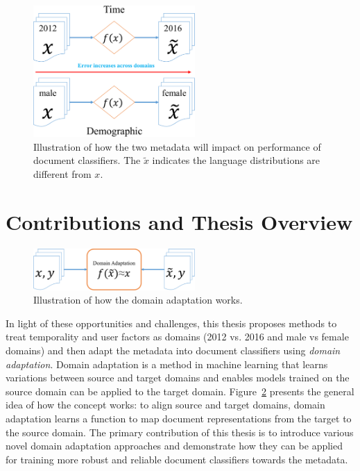 \begin{figure}[htp]
\centering
\includegraphics[width=0.55\textwidth]{images/chapter1/metadata_impact.pdf}
\caption{Illustration of how the two metadata will impact on performance of document classifiers. The $\tilde{x}$ indicates the language distributions are different from $x$.}
\label{chap1:fig:impact}
\end{figure}

\section{Contributions and Thesis Overview}

\begin{figure}[htp]
\centering
\includegraphics[width=0.55\textwidth]{images/chapter1/da_illu.pdf}
\caption{Illustration of how the domain adaptation works.}
\label{chap1:fig:da}
\end{figure}


In light of these opportunities and challenges, this thesis proposes methods to treat temporality and user factors as domains (2012 vs. 2016 and male vs female domains) and then adapt the metadata into document classifiers using \textit{domain adaptation}.
Domain adaptation is a method in machine learning that learns variations between source and target domains and enables models trained on the source domain can be applied to the target domain. 
Figure~\ref{chap1:fig:da} presents the general idea of how the concept works: to align source and target domains, domain adaptation learns a function to map document representations from the target to the source domain.
The primary contribution of this thesis is to introduce various novel domain adaptation approaches and demonstrate how they can be applied for training more robust and reliable document classifiers towards the metadata.

